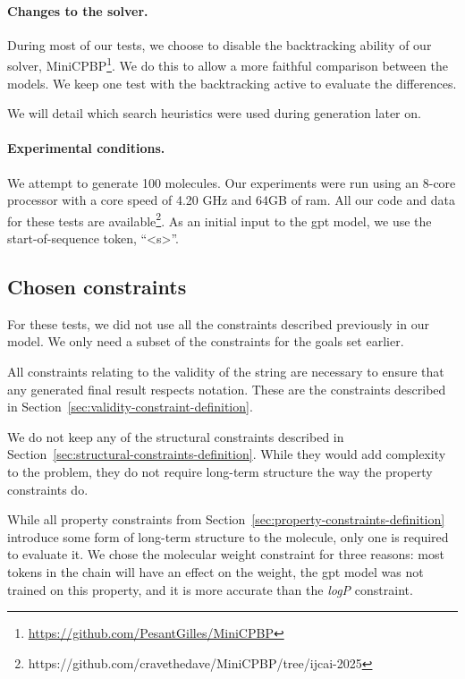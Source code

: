 \documentclass[../Document.tex]{subfiles}
\begin{document}
\paragraph{Changes to the \cp solver.}
During most of our tests, we choose to disable the backtracking ability of our \cp solver, MiniCPBP\footnote{\url{https://github.com/PesantGilles/MiniCPBP}}.
We do this to allow a more faithful comparison between the models.
We keep one test with the backtracking active to evaluate the differences.

We will detail which search heuristics were used during generation later on.

\paragraph{Experimental conditions.}
We attempt to generate 100 molecules.
Our experiments were run using an 8-core processor with a core speed of 4.20 GHz and 64GB of \gls{ram}.
All our code and data for these tests are available\footnote{https://github.com/cravethedave/MiniCPBP/tree/ijcai-2025}.
As an initial input to the \gls{gpt} model, we use the start-of-sequence token, ``<s>''.

\subsection{Chosen constraints}
For these tests, we did not use all the constraints described previously in our \cp model.
We only need a subset of the constraints for the goals set earlier.

All constraints relating to the validity of the \smiles string are necessary to ensure that any generated final result respects \smiles notation. These are the constraints described in Section~\ref{sec:validity-constraint-definition}.

We do not keep any of the structural constraints described in Section~\ref{sec:structural-constraints-definition}. While they would add complexity to the problem, they do not require long-term structure the way the property constraints do.

While all property constraints from Section~\ref{sec:property-constraints-definition} introduce some form of long-term structure to the molecule, only one is required to evaluate it. We chose the molecular weight constraint for three reasons: most tokens in the chain will have an effect on the weight, the \gls{gpt} model was not trained on this property, and it is more accurate than the \emph{logP} constraint.
\end{document}
